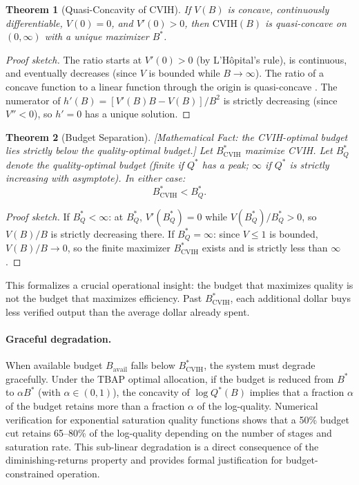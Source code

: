 \documentclass[11pt, a4paper]{googledeepmind}
\newtheorem{theorem}{Theorem}[section]
\begin{document}
\begin{theorem}[Quasi-Concavity of CVIH]
\label{thm:econ-cvih-quasi}
If $V(B)$ is concave, continuously differentiable, $V(0) = 0$, and $V'(0) > 0$, then $\text{CVIH}(B)$ is quasi-concave on $(0, \infty)$ with a unique maximizer $B^*$.
\end{theorem}

\begin{proof}[Proof sketch]
The ratio starts at $V'(0) > 0$ (by L'H\^{o}pital's rule), is continuous, and eventually decreases (since $V$ is bounded while $B \to \infty$). The ratio of a concave function to a linear function through the origin is quasi-concave \citep{boyd2004}. The numerator of $h'(B) = [V'(B)B - V(B)]/B^2$ is strictly decreasing (since $V'' < 0$), so $h' = 0$ has a unique solution.
\end{proof}

\begin{theorem}[Budget Separation]
\label{thm:econ-budget-sep}
\emph{[Mathematical Fact: the CVIH-optimal budget lies strictly below the quality-optimal budget.]}
Let $B^*_{\text{CVIH}}$ maximize CVIH. Let $B^*_Q$ denote the quality-optimal budget (finite if $Q^*$ has a peak; $\infty$ if $Q^*$ is strictly increasing with asymptote). In either case:
\begin{equation}\label{eq:econ-budget-sep}
    B^*_{\text{CVIH}} < B^*_Q.
\end{equation}
\end{theorem}

\begin{proof}[Proof sketch]
If $B^*_Q < \infty$: at $B^*_Q$, $V'(B^*_Q) = 0$ while $V(B^*_Q)/B^*_Q > 0$, so $V(B)/B$ is strictly decreasing there. If $B^*_Q = \infty$: since $V \leq 1$ is bounded, $V(B)/B \to 0$, so the finite maximizer $B^*_{\text{CVIH}}$ exists and is strictly less than $\infty$.
\end{proof}

This formalizes a crucial operational insight: the budget that maximizes quality is not the budget that maximizes efficiency. Past $B^*_{\text{CVIH}}$, each additional dollar buys less verified output than the average dollar already spent.

\paragraph{Graceful degradation.} When available budget $B_{\text{avail}}$ falls below $B^*_{\text{CVIH}}$, the system must degrade gracefully. Under the TBAP optimal allocation, if the budget is reduced from $B^*$ to $\alpha B^*$ (with $\alpha \in (0,1)$), the concavity of $\log Q^*(B)$ implies that a fraction $\alpha$ of the budget retains more than a fraction $\alpha$ of the log-quality. Numerical verification for exponential saturation quality functions shows that a 50\% budget cut retains 65--80\% of the log-quality depending on the number of stages and saturation rate. This sub-linear degradation is a direct consequence of the diminishing-returns property and provides formal justification for budget-constrained operation.
\end{document}
